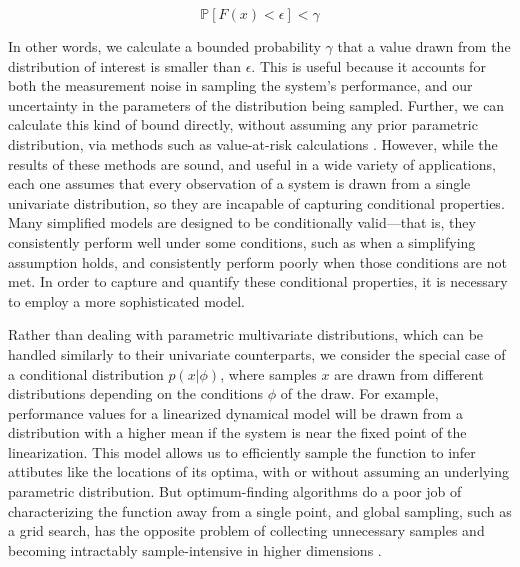 \documentclass{amsart}
\begin{document}
\begin{equation}
    \mathbb{P}[F(x)<\epsilon]<\gamma \nonumber
\end{equation}

In other words, we calculate a bounded probability $\gamma$ that a value drawn from the distribution of interest is smaller than $\epsilon$. This is useful because it accounts for both the measurement noise in sampling the system's performance, and our uncertainty in the parameters of the distribution being sampled. Further, we can calculate this kind of bound directly, without assuming any prior parametric distribution, via methods such as value-at-risk calculations \cite{jorion06,kuester06}. However, while the results of these methods are sound, and useful in a wide variety of applications, each one assumes that every observation of a system is drawn from a single univariate distribution, so they are incapable of capturing conditional properties. Many simplified models are designed to be conditionally valid---that is, they consistently perform well under some conditions, such as when a simplifying assumption holds, and consistently perform poorly when those conditions are not met. In order to capture and quantify these conditional properties, it is necessary to employ a more sophisticated model.
\newline

Rather than dealing with parametric multivariate distributions, which can be handled similarly to their univariate counterparts, we consider the special case of a conditional distribution $p(x|\phi)$, where samples $x$ are drawn from different distributions depending on the conditions $\phi$ of the draw. For example, performance values for a linearized dynamical model will be drawn from a distribution with a higher mean if the system is near the fixed point of the linearization. This model allows us to efficiently sample the function to infer attibutes like the locations of its optima, with \cite{chowdhury17}\cite{srinivas09} or without \cite{bonyadi17}\cite{akella22} assuming an underlying parametric distribution. But optimum-finding algorithms do a poor job of characterizing the function away from a single point, and global sampling, such as a grid search, has the opposite problem of collecting unnecessary samples and becoming intractably sample-intensive in higher dimensions \cite{chen15}\cite{he20}.
\end{document}
